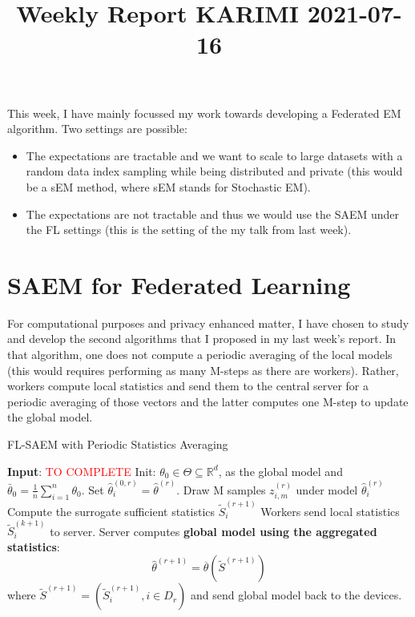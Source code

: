 \documentclass{article}
\begin{document}
\title{Weekly Report KARIMI 2021-07-16}


\date{}
\maketitle

This week, I have mainly focussed my work towards developing a Federated EM algorithm.
Two settings are possible: 
\begin{itemize}
\item The expectations are tractable and we want to scale to large datasets with a random data index sampling while being distributed and private (this would be a sEM method, where sEM stands for Stochastic EM).
\item The expectations are not tractable and thus we would use the SAEM under the FL settings (this is the setting of the my talk from last week).
\end{itemize}

\section{SAEM for Federated Learning}

For computational purposes and privacy enhanced matter, I have chosen to study and develop the second algorithms that I proposed in my last week's report.
In that algorithm, one does not compute a periodic averaging of the local models (this would requires performing as many M-steps as there are workers).
Rather, workers compute local statistics and send them to the central server for a periodic averaging of those vectors and the latter computes one M-step to update the global model.

\begin{algorithm}[H]
\caption{FL-SAEM with Periodic Statistics Averaging} \label{alg:flsaem2}
\begin{algorithmic}[1]
\STATE \textbf{Input}: \textcolor{red}{TO COMPLETE}
\STATE Init: $\theta_{0} \in \Theta \subseteq \mathbb R^d $, as the global model and $\bar{\theta}_0 =  \frac{1}{n} \sum_{i=1}^n \theta_0$.
\STATE Set $\hat{\theta}^{(0,r)}_i = \hat{\theta}^{(r)}$.
\STATE Draw M samples $z_{i,m}^{(r)}$ under model $\hat{\theta}^{(r)}_i$ \label{line:sampling}
\STATE Compute the surrogate sufficient statistics $\tilde{S}_{i}^{(r+1)}$ \label{line:compute}
\STATE Workers send local statistics $\tilde{S}_{i}^{(k+1)}$ to server.
\ENDFOR
\STATE Server computes \textbf{global model using the aggregated statistics}:
$$
\hat{\theta}^{(r+1)} = \overline{\theta}( \tilde{S}^{(r+1)}) 
$$
where $\tilde{S}^{(r+1)} = (\tilde{S}_i^{(r+1)}, i \in D_r)$  and send global model back to the devices. 
\ENDFOR
\end{algorithmic}
\end{algorithm}
\end{document}
